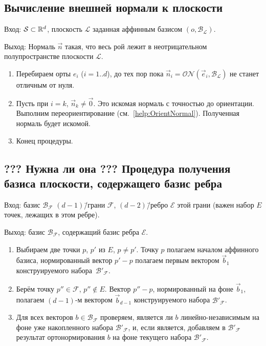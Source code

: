 \documentclass[a4paper,12pt]{article}
\newcommand{\R}[1][]{%
  \ifthenelse{\equal{#1}{}}%
  {\mathbb{R}}%
  {\mathbb{R}^{#1}}}
\newcommand{\Swarm}{\mathcal{S}}              %
\newcommand{\Facet}{\mathcal{F}}              %
\newcommand{\Edge}{\mathcal{E}}               %
\newcommand{\Basis}{\mathcal{B}}              %
\newcommand{\ZVec}{\vec 0}                    %
\newcommand{\ONorm}[3][]{\mathcal{ON}#1( #2, #3 #1)} %
\newcommand{\Plane}{\mathcal{L}}           %
\renewcommand{\.}{\hspace{0.2ex}}
\begin{document}
    \subsection{Вычисление внешней нормали к плоскости}
      \label{help:CalcOuterNormal}
    Вход: $\Swarm \subset \R[d]$, плоскость $\Plane$ заданная аффинным базисом $(o, \Basis_\Plane)$.

    Выход: Нормаль $\vec n$ такая, что весь рой лежит в неотрицательном полупространстве плоскости $\Plane$.

    \begin{enumerate}
      \item Перебираем орты $e_i$ ($i=1..d$), до тех пор пока $\vec n_i = \ONorm{\vec e_i}{\Basis_\Plane}$ не станет отличным от нуля.

      \item Пусть при $i = k$, $\vec n_k \neq \ZVec$. Это искомая нормаль с точностью до ориентации. Выполним переориентирование (см.~\ref{help:OrientNormal}). Полученная нормаль будет искомой.

      \item Конец процедуры.
    \end{enumerate}




  \subsection{??? Нужна ли она ??? Процедура получения базиса плоскости, содержащего базис ребра}
    \label{help:BuildFaceBasisBasedOnEdge}
    Вход: базис $\Basis_{\Facet}$ $(d-1)$\=/грани $\Facet$, $(d-2)$\=/ребро $\Edge$ этой грани (важен набор $E$ точек, лежащих в этом ребре).

    Выход: базис $\Basis_{\Facet}$, содержащий базис ребра $\Edge$.
    \begin{enumerate}
      \item Выбираем две точки $p$, $p'$ из $E$, $p \neq p'$. Точку $p$ полагаем началом аффинного базиса, нормированный вектор $p'-p$ полагаем первым вектором $\vec b_1$ конструируемого набора~$\Basis'_{\Facet}$.
      \item Берём точку $p'' \in \Facet$, $p'' \notin E$. Вектор $p''-p$, нормированный на фоне $\vec b_1$, полагаем $(d-1)$-м вектором $\vec b_{d-1}$ конструируемого набора $\Basis'_{\Facet}$.
      \item Для всех векторов $b \in \Basis_{\Facet}$ проверяем, является ли $b$ линейно-независимым на фоне уже накопленного набора $\Basis'_{\Facet}$, и, если является, добавляем в $\Basis'_{\Facet}$ результат ортонормирования $b$ на фоне текущего набора $\Basis'_{\Facet}$.
    \end{enumerate}
\end{document}
